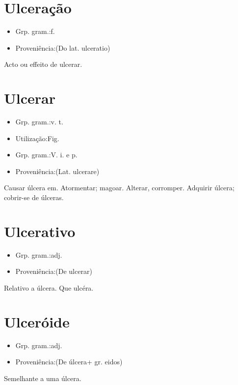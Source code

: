 \documentclass{article}
\begin{document}
\section{Ulceração}
\begin{itemize}
\item {Grp. gram.:f.}
\end{itemize}
\begin{itemize}
\item {Proveniência:(Do lat. \textunderscore ulceratio\textunderscore )}
\end{itemize}
Acto ou effeito de ulcerar.
\section{Ulcerar}
\begin{itemize}
\item {Grp. gram.:v. t.}
\end{itemize}
\begin{itemize}
\item {Utilização:Fig.}
\end{itemize}
\begin{itemize}
\item {Grp. gram.:V. i.  e  p.}
\end{itemize}
\begin{itemize}
\item {Proveniência:(Lat. \textunderscore ulcerare\textunderscore )}
\end{itemize}
Causar úlcera em.
Atormentar; magoar.
Alterar, corromper.
Adquirir úlcera; cobrir-se de úlceras.
\section{Ulcerativo}
\begin{itemize}
\item {Grp. gram.:adj.}
\end{itemize}
\begin{itemize}
\item {Proveniência:(De \textunderscore ulcerar\textunderscore )}
\end{itemize}
Relativo a úlcera.
Que ulcéra.
\section{Ulceróide}
\begin{itemize}
\item {Grp. gram.:adj.}
\end{itemize}
\begin{itemize}
\item {Proveniência:(De \textunderscore úlcera\textunderscore  + gr. \textunderscore eidos\textunderscore )}
\end{itemize}
Semelhante a uma úlcera.
\end{document}
